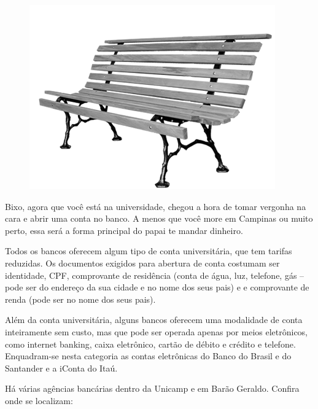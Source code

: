 \begin{figure}[h!]
    \centering
    \includegraphics[scale=2.28,keepaspectratio=true]{img/imgs/9-outras_necessidades/raizmadeira.png}
\end{figure}

Bixo, agora que você está na universidade, chegou a hora de tomar vergonha na
cara e abrir uma conta no banco. A menos que você more em Campinas ou muito perto,
essa será a forma principal do papai te mandar dinheiro.

Todos os bancos oferecem algum tipo de conta universitária, que tem tarifas
reduzidas. Os documentos exigidos para abertura de conta costumam ser identidade,
CPF, comprovante de residência (conta de água, luz, telefone, gás -- pode ser do
endereço da sua cidade e no nome dos seus pais) e e comprovante de renda (pode
ser no nome dos seus pais).

Além da conta universitária, alguns bancos oferecem uma modalidade de conta
inteiramente sem custo, mas que pode ser operada apenas por meios eletrônicos,
como internet banking, caixa eletrônico, cartão de débito e crédito e telefone.
Enquadram-se nesta categoria as contas eletrônicas do Banco do Brasil e do Santander
e a iConta do Itaú.

Há várias agências bancárias dentro da Unicamp e em Barão Geraldo. Confira onde
se localizam:

